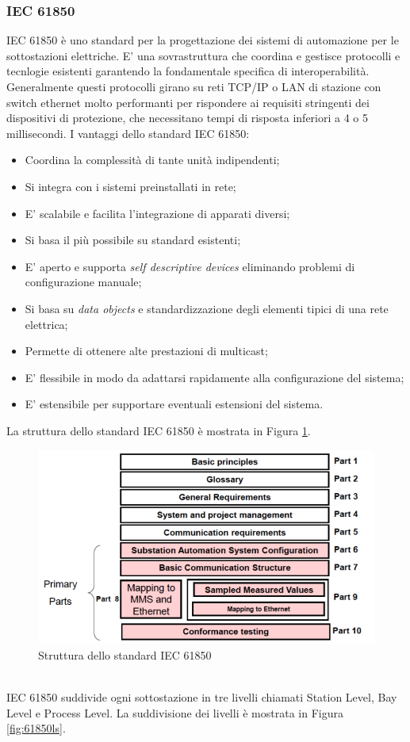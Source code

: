 \subsubsection{IEC 61850}
IEC 61850 è uno standard per la progettazione dei sistemi di automazione per le sottostazioni elettriche. E' una sovrastruttura che coordina e gestisce protocolli e tecnlogie esistenti garantendo la fondamentale specifica di interoperabilità. Generalmente questi protocolli girano su reti TCP/IP o LAN di stazione con switch ethernet molto performanti per rispondere ai requisiti stringenti dei dispositivi di protezione, che necessitano tempi di risposta inferiori a 4 o 5 millisecondi.\newline
I vantaggi dello standard IEC 61850:
\begin{itemize}
	\item Coordina la complessità di tante unità indipendenti;
	\item Si integra con i sistemi preinstallati in rete;
	\item E' scalabile e facilita l'integrazione di apparati diversi;
	\item Si basa il più possibile su standard esistenti;
	\item E' aperto e supporta \emph{self descriptive devices} eliminando problemi di configurazione manuale;
	\item Si basa su \emph{data objects} e standardizzazione degli elementi tipici di una rete elettrica;
	\item Permette di ottenere alte prestazioni di multicast;
	\item E' flessibile in modo da adattarsi rapidamente alla configurazione del sistema;
	\item E' estensibile per supportare eventuali estensioni del sistema.
\end{itemize}
\newpage
La struttura dello standard IEC 61850\cite{iec61850} è mostrata in Figura \ref{fig:iec61850}.
\begin{figure}[h]
	\centering
	\includegraphics[scale=0.400]{imgs/iec61850.png}
	\caption{Struttura dello standard IEC 61850} \label{fig:iec61850}
\end{figure}\\
IEC 61850 suddivide ogni sottostazione in tre livelli\cite{61850} chiamati Station Level, Bay Level e Process Level. La suddivisione dei livelli è mostrata in Figura \ref{fig:61850ls}.

